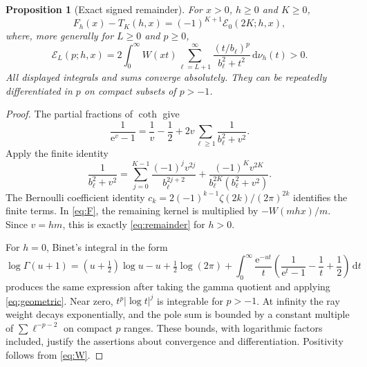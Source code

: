 \documentclass[11pt,a4paper]{article}
\numberwithin{equation}{section}
\newtheorem{proposition}[theorem]{Proposition}
\theoremstyle{definition}\newtheorem{definition}[theorem]{Definition}
\theoremstyle{remark}\newtheorem{remark}[theorem]{Remark}
\newcommand{\e}{\mathrm e}
\newcommand{\dd}{\,\mathrm d}
\newcommand{\calE}{\mathcal E}
\begin{document}
\begin{proposition}[Exact signed remainder]
\label{prop:remainder}
For $x>0$, $h\ge0$ and $K\ge0$,
\begin{equation}
 F_h(x)-T_K(h,x)=(-1)^{K+1}\calE_0(2K;h,x),
 \label{eq:remainder}
\end{equation}
where, more generally for $L\ge0$ and $p\ge0$,
\begin{equation}
 \calE_L(p;h,x)=2\int_0^\infty W(xt)
      \sum_{\ell=L+1}^\infty
      \frac{(t/b_\ell)^p}{b_\ell^2+t^2}\dd\nu_h(t)>0.
 \label{eq:E}
\end{equation}
All displayed integrals and sums converge absolutely. They can be
repeatedly differentiated in $p$ on compact subsets of $p>-1$.
\end{proposition}
\begin{proof}
The partial fractions of $\coth$ \cite{dlmf-hyperbolic} give
\[
 \frac1{\e^v-1}=\frac1v-\frac12+
       2v\sum_{\ell\ge1}\frac1{b_\ell^2+v^2}.
\]
Apply the finite identity
\begin{equation}
 \frac1{b_\ell^2+v^2}
 =\sum_{j=0}^{K-1}\frac{(-1)^jv^{2j}}{b_\ell^{2j+2}}
    +\frac{(-1)^Kv^{2K}}{b_\ell^{2K}(b_\ell^2+v^2)}.
 \label{eq:geometric}
\end{equation}
The Bernoulli coefficient identity
$c_k=2(-1)^{k-1}\zeta(2k)/(2\pi)^{2k}$ identifies the finite terms.
In \eqref{eq:F}, the remaining kernel is multiplied by $-W(mhx)/m$.
Since $v=hm$, this is exactly \eqref{eq:remainder} for $h>0$.

For $h=0$, Binet's integral \cite{dlmf-gamma} in the form
\[
 \log\Gamma(u+1)=\left(u+\tfrac12\right)\log u-u
 +\tfrac12\log(2\pi)
 +\int_0^\infty\frac{\e^{-ut}}t
 \left(\frac1{\e^t-1}-\frac1t+\frac12\right)\dd t
\]
produces the same expression after taking the gamma quotient and applying
\eqref{eq:geometric}. Near zero, $t^p|\log t|^j$ is integrable for $p>-1$.
At infinity the ray weight decays exponentially, and the pole sum is
bounded by a constant multiple of $\sum\ell^{-p-2}$ on compact $p$ ranges.
These bounds, with logarithmic factors included, justify the assertions
about convergence and differentiation. Positivity follows from
\eqref{eq:W}.
\end{proof}
\end{document}
